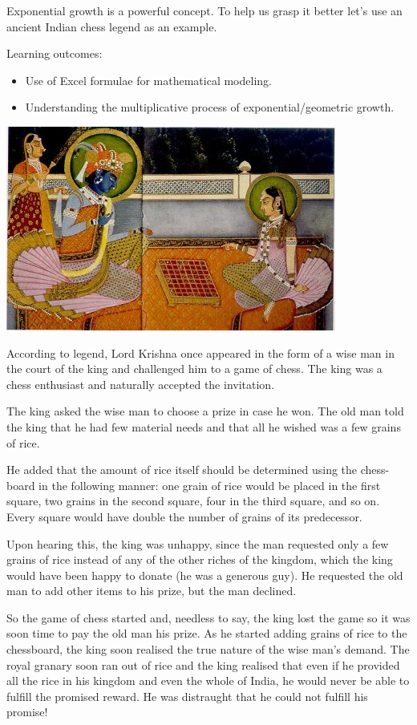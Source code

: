 \documentclass[
  a4paper]{book}
\providecommand{\tightlist}{%
  \setlength{\itemsep}{0pt}\setlength{\parskip}{0pt}}
\begin{document}
Exponential growth is a powerful concept. To help us grasp it better let's use an ancient Indian chess legend as an example.

\begin{do-something}
Learning outcomes:

\begin{itemize}
\tightlist
\item
  Use of Excel formulae for mathematical modeling.
\item
  Understanding the multiplicative process of exponential/geometric
  growth.
\end{itemize}
\end{do-something}

\begin{center}\includegraphics[width=0.5\linewidth]{images/Radha-Krishna_chess} \end{center}

According to legend, Lord Krishna once appeared in the form of a wise man in the court of the king and challenged him to a game of chess. The king was a chess enthusiast and naturally accepted the invitation.

The king asked the wise man to choose a prize in case he won. The old man told the king that he had few material needs and that all he wished was a few grains of rice.

He added that the amount of rice itself should be determined using the chess- board in the following manner: one grain of rice would be placed in the first square, two grains in the second square, four in the third square, and so on. Every square would have double the number of grains of its predecessor.

Upon hearing this, the king was unhappy, since the man requested only a few grains of rice instead of any of the other riches of the kingdom, which the king would have been happy to donate (he was a generous guy). He requested the old man to add other items to his prize, but the man declined.

So the game of chess started and, needless to say, the king lost the game so it was soon time to pay the old man his prize. As he started adding grains of rice to the chessboard, the king soon realised the true nature of the wise man's demand. The royal granary soon ran out of rice and the king realised that even if he provided all the rice in his kingdom and even the whole of India, he would never be able to fulfill the promised reward. He was distraught that he could not fulfill his promise!
\end{document}
